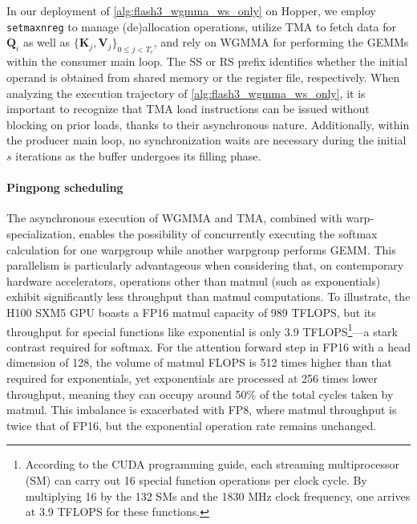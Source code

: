 In our deployment of \cref{alg:flash3_wgmma_ws_only} on Hopper, we employ \verb|setmaxnreg| to manage (de)allocation operations, utilize TMA to fetch data for $\mathbf{Q}_i$ as well as $\{ \mathbf{K}_j, \mathbf{V}_j \}_{0 \leq j < T_c}$, and rely on WGMMA for performing the GEMMs within the consumer main loop. The SS or RS prefix identifies whether the initial operand is obtained from shared memory or the register file, respectively. When analyzing the execution trajectory of \cref{alg:flash3_wgmma_ws_only}, it is important to recognize that TMA load instructions can be issued without blocking on prior loads, thanks to their asynchronous nature. Additionally, within the producer main loop, no synchronization waits are necessary during the initial $s$ iterations as the buffer undergoes its filling phase.

\paragraph{Pingpong scheduling} The asynchronous execution of WGMMA and TMA, combined with warp-specialization, enables the possibility of concurrently executing the softmax calculation for one warpgroup while another warpgroup performs GEMM. This parallelism is particularly advantageous when considering that, on contemporary hardware accelerators, operations other than matmul (such as exponentials) exhibit significantly less throughput than matmul computations. To illustrate, the H100 SXM5 GPU boasts a FP16 matmul capacity of 989 TFLOPS, but its throughput for special functions like exponential is only 3.9 TFLOPS\footnote{According to the CUDA programming guide, each streaming multiprocessor (SM) can carry out 16 special function operations per clock cycle. By multiplying 16 by the 132 SMs and the 1830 MHz clock frequency, one arrives at 3.9 TFLOPS for these functions.}—a stark contrast required for softmax. For the attention forward step in FP16 with a head dimension of 128, the volume of matmul FLOPS is 512 times higher than that required for exponentials, yet exponentials are processed at 256 times lower throughput, meaning they can occupy around 50\% of the total cycles taken by matmul. This imbalance is exacerbated with FP8, where matmul throughput is twice that of FP16, but the exponential operation rate remains unchanged.

